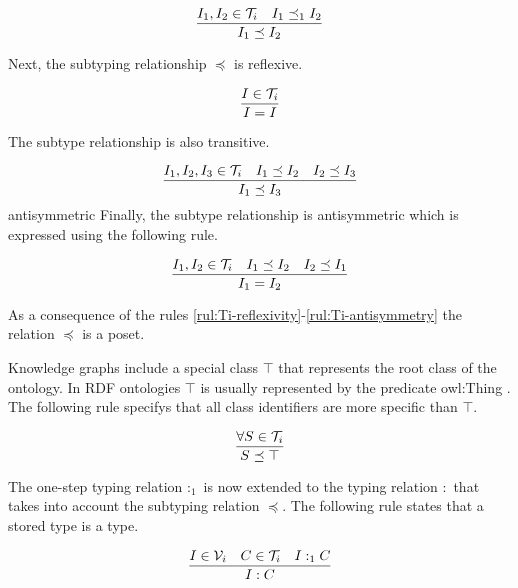 \documentclass[runningheads]{llncs}
\newcommand{\V}{{\cal V}}
\newcommand{\T}{{\cal T}}
\begin{document}
\begin{equation}
\label{rul:Ic-extended}
\dfrac{I_1,I_2\in\T_i \quad I_1\preceq_1\/I_2}
      {I_1 \preceq I_2}
\end{equation}

Next, the subtyping relationship $\preceq$ is reflexive.

\begin{equation}
\label{rul:Ti-reflexivity}
\dfrac{I\in\T_i}
      {I=I}
\end{equation}

The subtype relationship is also transitive. 

\begin{equation}
\label{rul:Ti-transitivity}
\dfrac{I_1,I_2,I_3\in\T_i\quad\/I_1\preceq\/I_2\quad\/I_2\preceq\/I_3}
      {I_1\preceq\/I_3}   
\end{equation}
antisymmetric
Finally, the subtype relationship is antisymmetric which is expressed
using the following rule.

\begin{equation}
\label{rul:Ti-antisymmetry}
\dfrac{I_1,I_2\in\T_i \quad I_1\preceq\/I_2 \quad I_2\preceq\/I_1}
      {I_1=I_2}   
\end{equation}

As a consequence of the rules
\ref{rul:Ti-reflexivity}-\ref{rul:Ti-antisymmetry} the relation
$\preceq$ is a poset.

Knowledge graphs include a special class $\top$ that represents the
root class of the ontology. In RDF ontologies $\top$ is usually
represented by the predicate owl:Thing \cite{Hoffart2013}. The
following rule specifys that all class identifiers are more specific
than $\top$.

\begin{equation}
\dfrac{\forall\/S\in\T_i}
      {S\preceq\top}
\end{equation}

The one-step typing relation $:_1$ is now extended to the typing
relation $:$ that takes into account the subtyping relation $\preceq$.
The following rule states that a stored type is a type.

\begin{equation}
\dfrac{I\in\V_i\quad\/C\in\T_i\quad\/I:_1\/C}
      {I:C}
\end{equation}
\end{document}
